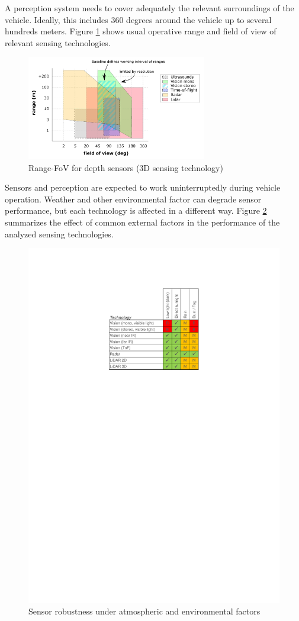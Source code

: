 A perception system needs to cover adequately the relevant surroundings of the
vehicle. Ideally, this includes 360 degrees around the vehicle up to several
hundreds meters. Figure \ref{fig:range-fov} shows usual operative range and
field of view of relevant sensing technologies. 

\begin{figure}[h]
    \centering
    \includegraphics[width=0.7\textwidth]{"img/plot_range-fov"}
    \caption{Range-FoV for depth sensors (3D sensing technology)}
    \label{fig:range-fov}
\end{figure}

Sensors and perception are expected to work uninterruptedly during vehicle 
operation. Weather and other environmental factor can degrade sensor
performance, but each technology is affected in a different way. 
Figure \ref{fig:sensors-environ} summarizes the effect of common external
factors in the performance of the analyzed sensing technologies.

\begin{figure}[h]
    \centering
    \includegraphics[width=0.75\linewidth]{"img/sensors_atmospheric_conditions"}
    \caption{Sensor robustness under atmospheric and environmental factors}
    \label{fig:sensors-environ}
\end{figure}

